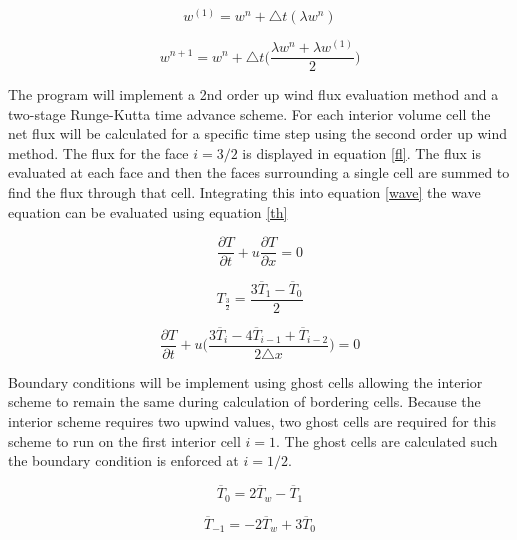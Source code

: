 \documentclass[paper=a4, fontsize=11pt, abstract=on]{scrartcl}
\numberwithin{equation}{section}		%
\numberwithin{figure}{section}			%
\numberwithin{table}{section}				%
\begin{document}
 \begin{equation}
\label{rung1}
w^{(1)}=w^n+\triangle t(\lambda w^n)
\end{equation} 


 \begin{equation}
\label{rung2}
w^{n+1}=w^n+\triangle t\Bigg(\frac{\lambda w^n+\lambda w^{(1)}}{2}\Bigg)
\end{equation}

 The program will implement a 2nd order up wind flux evaluation method and a two-stage Runge-Kutta time advance scheme. For each interior volume cell the net flux will be calculated for a specific time step using the second order up wind method. The flux for the face $i=3/2$ is displayed in equation \ref{fl}. The flux is evaluated at each face and then the faces surrounding a single cell are summed to find the flux through that cell. Integrating this into equation \ref{wave} the wave equation can be evaluated using equation \ref{th}
 
  \begin{equation}
\label{wave}
\frac{\partial T}{\partial t} + u\frac{\partial T}{\partial x} = 0
\end{equation}

 \begin{equation}
\label{fl}
T_{\frac{3}{2}}=\frac{3\overline{T}_{1}-\overline{T}_{0}}{2} 
\end{equation}

 \begin{equation}
\label{th}
\frac{\partial T}{\partial t} + u\Bigg(\frac{3\overline{T}_{i}-4\overline{T}_{i-1}+\overline{T}_{i-2}}{2\triangle x}\Bigg)  = 0
\end{equation}

Boundary conditions will be implement using ghost cells allowing the interior scheme to remain the same during calculation of bordering cells. Because the interior scheme requires two upwind values, two ghost cells are required for this scheme to run on the first interior cell $i=1$. The ghost cells are calculated such the boundary condition is enforced at $i=1/2$. 



\begin{equation}
\label{neum}
\overline{T}_{0} = 2\overline{T}_{w}-\overline{T}_{1} 
\end{equation} 

\begin{equation}
\label{neum2}
\overline{T}_{-1} = -2\overline{T}_{w}+3\overline{T}_{0} 
\end{equation} 
\end{document}
